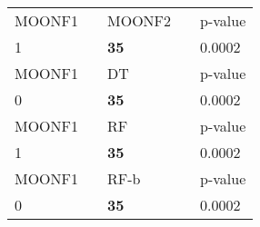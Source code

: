 \begin{tabular}{ l l l l l}
\midrule
{MOONF1} & & {MOONF2} & & {p-value}\\
1 & & \textbf{35} & & 0.0002\\
\midrule
{MOONF1} & & {DT} & & {p-value}\\
0 & & \textbf{35} & & 0.0002\\
\midrule
{MOONF1} & & {RF} & & {p-value}\\
1 & & \textbf{35} & & 0.0002\\
\midrule
{MOONF1} & & {RF-b} & & {p-value}\\
0 & & \textbf{35} & & 0.0002\\
\midrule
\end{tabular}
